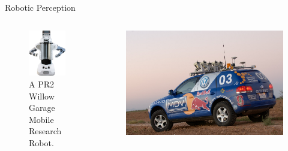 \documentclass{beamer}
\newcommand\Fontsmall{\fontsize{6}{5}\selectfont}
\begin{document}
\begin{frame}{Robotic Perception}
    \begin{columns}[T]
        \begin{column}{.333\textwidth}
            \begin{figure}
                \includegraphics[width=\textwidth]{Images/robot-exterior.png}
                \caption{A PR2 Willow Garage Mobile Research Robot. \Fontsmall{Image: Copyright Willow Garage.}}
            \end{figure}
        \end{column}
        \begin{column}{.666\textwidth}
            \begin{figure}
                \includegraphics[width=.92\textwidth]{Images/stanley.jpg}

\end{figure}
\end{column}
\end{columns}
\end{frame}
\end{document}

